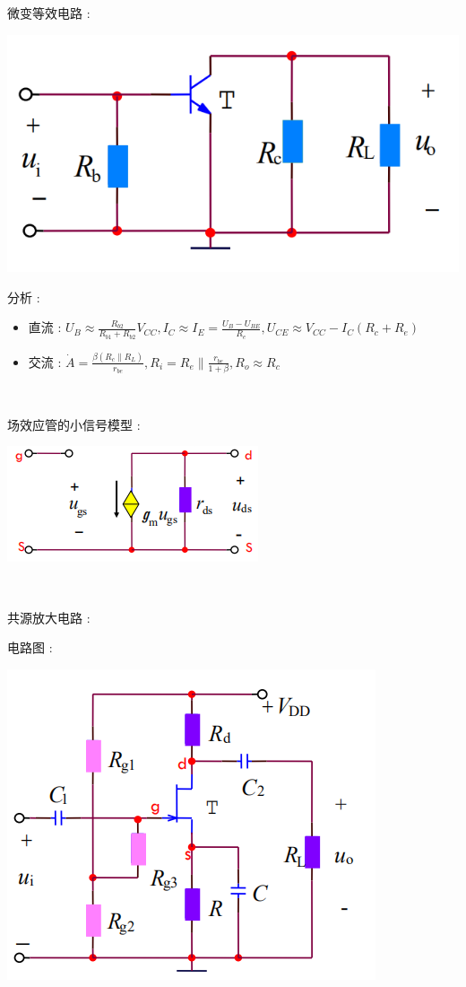 \documentclass[UTF8, 12pt]{ctexart}
\begin{document}
	微变等效电路 :

	\includegraphics[scale = 0.4]{02/基本共射放大电路交流通路.png}

	分析 :
	\begin{itemize}[leftmargin = 4em]
		\item 直流 : $ U_{B} \approx \frac{R_{b2}}{R_{b1}+R_{b2}}V_{CC}, I_{C} \approx I_{E} = \frac{U_{B}-U_{BE}}{R_{e}}, U_{CE} \approx V_{CC} - I_{C}(R_{c}+R_{e}) $
		\item 交流 : $ \dot{A} = \frac{\beta(R_{c} \parallel R_{L})}{r_{be}}, R_{i} = R_{e} \parallel \frac{r_{be}}{1+\beta}, R_{o} \approx R_{c} $
	\end{itemize}

	~

	\noindent 
	场效应管的小信号模型 :

	\includegraphics[]{02/场效应管小信号模型.png}

	~

	\noindent
	共源放大电路 :

	电路图 :

	\includegraphics[scale = 0.4]{02/共源放大电路电路图.png}
\end{document}
